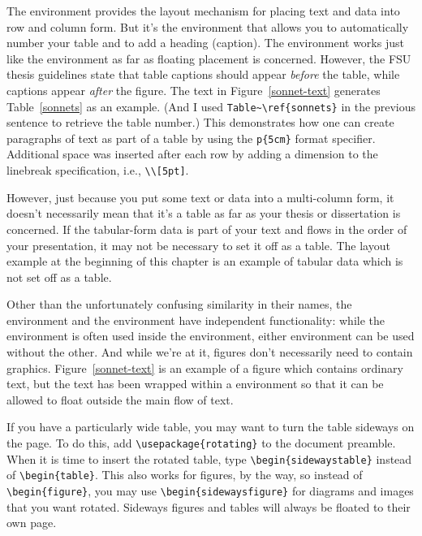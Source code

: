 The  environment provides the layout mechanism for
placing text and data into row and column form.  But it's the
 environment that allows you to automatically number your
table and to add a heading (caption).  The  environment
works just like the  environment as far as floating
placement is concerned.  However, the FSU thesis guidelines state that
table captions should appear \emph{before} the table, while
 captions appear \emph{after} the figure.  The text in
Figure~\ref{sonnet-text} generates Table~\ref{sonnets} as an example.
(And I used \verb|Table~\ref{sonnets}| in the previous sentence to
retrieve the table number.)  This demonstrates how one can create
paragraphs of text as part of a table by using the \verb|p{5cm}|
format specifier.  Additional space was inserted after each row by
adding a dimension to the linebreak specification, i.e., \verb|\\[5pt]|.

However, just because you put some text or data into a multi-column
form, it doesn't necessarily mean that it's a table as far as your
thesis or dissertation is concerned.  If the tabular-form data is part
of your text and flows in the order of your presentation, it may not
be necessary to set it off as a table.  The layout example at the
beginning of this chapter is an example of tabular data which is not
set off as a table.

Other than the unfortunately confusing similarity in their names, the
 environment and the  environment have
independent functionality: while the  environment is
often used inside the  environment, either environment can
be used without the other.  And while we're at it, figures don't
necessarily need to contain graphics.  Figure~\ref{sonnet-text} is an
example of a figure which contains ordinary text, but the text has
been wrapped within a  environment so that it can be
allowed to float outside the main flow of text.

If you have a particularly wide table, you may want to turn the table
sideways on the page.  To do this, add \verb|\usepackage{rotating}| to
the document preamble.  When it is time to insert the rotated table,
type \verb|\begin{sidewaystable}| instead of \verb|\begin{table}|.
This also works for figures, by the way, so instead of
\verb|\begin{figure}|, you may use \verb|\begin{sidewaysfigure}| for
diagrams and images that you want rotated.  Sideways figures and
tables will always be floated to their own page.


